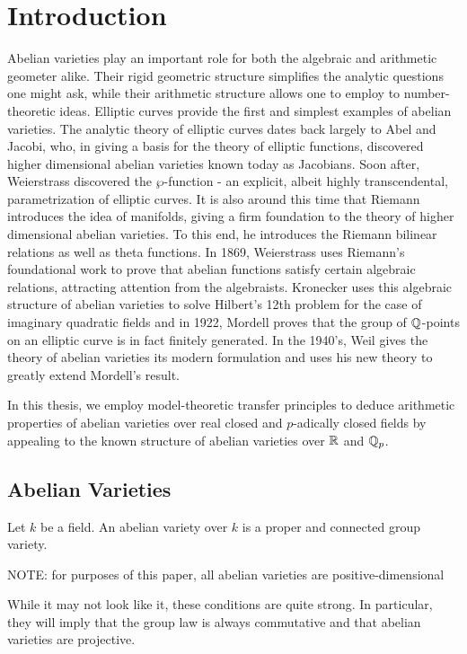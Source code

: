 \chapter{Introduction}

Abelian varieties play an important role for both the algebraic and arithmetic geometer alike. Their rigid geometric structure simplifies the analytic questions one might ask, while their arithmetic structure allows one to employ to number-theoretic ideas. Elliptic curves provide the first and simplest examples of abelian varieties. The analytic theory of elliptic curves dates back largely to Abel and Jacobi, who, in giving a basis for the theory of elliptic functions, discovered higher dimensional abelian varieties known today as Jacobians. Soon after, Weierstrass discovered the $\wp$-function - an explicit, albeit highly transcendental, parametrization of elliptic curves. It is also around this time that Riemann introduces the idea of manifolds, giving a firm foundation to the theory of higher dimensional abelian varieties. To this end, he introduces the Riemann bilinear relations as well as theta functions. In 1869, Weierstrass uses Riemann's foundational work to prove that abelian functions satisfy certain algebraic relations, attracting attention from the algebraists. Kronecker uses this algebraic structure of abelian varieties to solve Hilbert's 12th problem for the case of imaginary quadratic fields and in 1922, Mordell proves that the group of $\mathbb{Q}$-points on an elliptic curve is in fact finitely generated. In the 1940's, Weil gives the theory of abelian varieties its modern formulation and uses his new theory to greatly extend Mordell's result.

In this thesis, we employ model-theoretic transfer principles to deduce arithmetic properties of abelian varieties over real closed and $p$-adically closed fields by appealing to the known structure of abelian varieties over $\mathbb{R}$ and $\mathbb{Q}_p$.

\section{Abelian Varieties}
\begin{definition}
 Let $k$ be a field. An abelian variety over $k$ is a proper and connected group variety. 
\end{definition}

NOTE: for purposes of this paper, all abelian varieties are positive-dimensional

While it may not look like it, these conditions are quite strong. In particular, they will imply that the group law is always commutative and that abelian varieties are projective.

